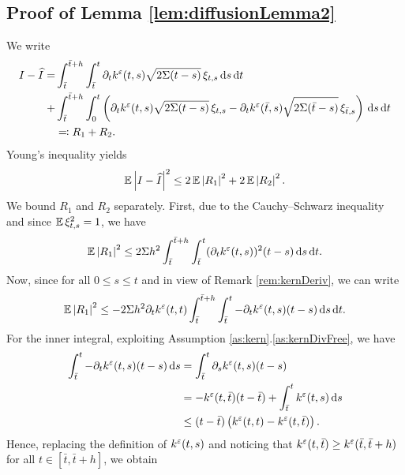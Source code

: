 \documentclass[10pt]{article}
\begin{document}
\subsection*{Proof of Lemma \ref{lem:diffusionLemma2}}
We write
\begin{equation}
\begin{aligned}
I - \widehat I = &\int_{\bar t}^{\bar t+h} \int_{\bar{t}}^t \partial_t k^\varepsilon(t, s) \sqrt{2\Sigma(t-s)} \, \xi_{t,s} \,\mathrm{d} s \,\mathrm{d} t\\
+ &\int_{\bar t}^{\bar t+h} \int_0^t \left( \partial_t k^\varepsilon(t, s) \sqrt{2\Sigma(t-s)} \, \xi_{t,s}  - \partial_t k^\varepsilon(\bar t, s) \sqrt{2\Sigma(\bar t-s)} \, \xi_{\bar t,s} \right)\,\mathrm{d} s \,\mathrm{d} t\\
&\eqqcolon R_1 + R_2.
\end{aligned}
\end{equation}
Young's inequality yields
\begin{equation}
\operatorname{\mathbb{E}}\left\lvert I-\widehat I\right\rvert^2 \leq 2\operatorname{\mathbb{E}}\left\lvert R_1\right\rvert^2 + 2\operatorname{\mathbb{E}}\left\lvert R_2\right\rvert^2.
\end{equation}
We bound $R_1$ and $R_2$ separately. First, due to the Cauchy--Schwarz inequality and since $\operatorname{\mathbb{E}} \xi_{t,s}^2 = 1$, we have
\begin{equation}
\operatorname{\mathbb{E}} \left\lvert R_1\right\rvert^2 \leq 2\Sigma h^2 \int_{\bar t}^{\bar t+h} \int_{\bar{t}}^t (\partial_t k^\varepsilon(t, s))^2  (t-s) \,\mathrm{d} s \,\mathrm{d} t.
\end{equation}
Now, since  for all $0 \leq s \leq t$ and in view of Remark \ref{rem:kernDeriv}, we can write
\begin{equation}
\operatorname{\mathbb{E}} \left\lvert R_1\right\rvert^2 \leq -2\Sigma h^2\partial_t k^\varepsilon(t, t) \int_{\bar{t}}^{\bar t + h}\int_{\bar t}^t -\partial_t k^\varepsilon(t, s)(t-s) \,\mathrm{d} s \,\mathrm{d} t.
\end{equation}
For the inner integral, exploiting Assumption \ref{as:kern}.\ref{as:kernDivFree}, we have
\begin{equation}
\begin{aligned}
\int_{\bar t}^t -\partial_t k^\varepsilon(t, s)(t-s) \,\mathrm{d} s &= \int_{\bar t}^t \partial_s k^\varepsilon(t, s)(t-s)\\
&= -k^\varepsilon(t, \bar t)(t - \bar t) + \int_{\bar t}^t k^\varepsilon(t, s) \,\mathrm{d} s \\
&\leq (t - \bar t) \left(k^\varepsilon(t, t) - k^\varepsilon(t, \bar t)\right).
\end{aligned}
\end{equation}
Hence, replacing the definition of $k^\varepsilon(t, s)$ and noticing that $k^\varepsilon(t, \bar t) \geq k^\varepsilon(\bar t, \bar t+h)$ for all $t \in [\bar t, \bar t + h]$, we obtain
\end{document}
